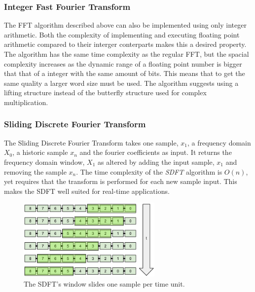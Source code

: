 \subsubsection{Integer Fast Fourier Transform} \label{appendix:IntFFT}
The FFT algorithm described above can also be implemented using only integer 
arithmetic. Both the complexity of implementing and executing floating point
arithmetic compared to their interger conterparts makes this a desired property.
The algorithm has the same time complexity as the regular FFT, but the spacial 
complexity increases as the dynamic range of a floating point number is bigger
that that of a integer with the same amount of bits. This means that to get
the same quality a larger word size must be used. The algorithm suggests 
using a lifting structure instead of the butterfly structure used for complex
multiplication.

\subsubsection{Sliding Discrete Fourier Transform}\label{appendix:SDFT}
The Sliding Discrete Fourier Transform takes one sample, $x_1$, a frequency
domain $X_0$, a historic sample $x_n$ and the fourier coefficients as input.
It returns the frequency domain window, $X_1$ as altered by adding the input
sample, $x_1$ and removing the sample $x_n$. The time complexity of the {\it SDFT}
algorithm is $O(n)$, yet requires that the transform is performed for each 
new sample input. This makes the SDFT well suited for real-time applications.

\begin{figure}[H]
    \centering
    \includegraphics[height=150px]{figures/theory/sdft_window_slide}
    \caption{The SDFT's window slides one sample per time unit.}
    \label{fig:sdft_window_slide}
\end{figure}
